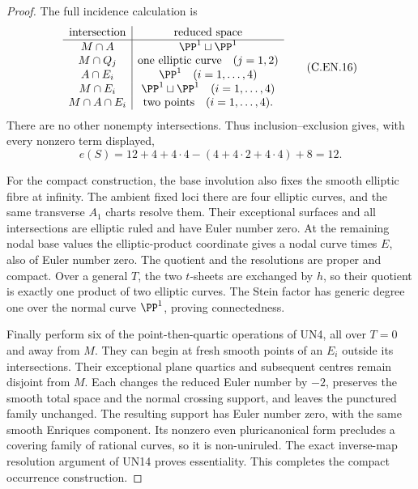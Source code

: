\begin{proof}
The full incidence calculation is
\[
 \begin{array}{c|c}
 \text{intersection}&\text{reduced space}\\ \hline
 M\cap A&\PP^1\sqcup\PP^1\\
 M\cap Q_j&\text{one elliptic curve}\quad(j=1,2)\\
 A\cap E_i&\PP^1\quad(i=1,\ldots,4)\\
 M\cap E_i&\PP^1\sqcup\PP^1\quad(i=1,\ldots,4)\\
 M\cap A\cap E_i&\text{two points}\quad(i=1,\ldots,4).
 \end{array}                                             \tag{C.EN.16}
\]
There are no other nonempty intersections.
Thus inclusion--exclusion gives, with
every nonzero term displayed,
\[
 e(S)=12+4+4\cdot4-(4+4\cdot2+4\cdot4)+8=12 .
                                                               \tag{C.EN.17}
\]

For the compact construction, the base involution
also fixes the smooth elliptic fibre at infinity.
The ambient fixed loci there are four elliptic
curves, and the same transverse $A_1$ charts
resolve them. Their exceptional surfaces and
all intersections are elliptic ruled and
have Euler number zero. At the remaining
nodal base values the elliptic-product
coordinate gives a nodal curve times $E$,
also of Euler number zero. The quotient
and the resolutions are proper and compact.
Over a general $T$, the two $t$-sheets
are exchanged by $h$, so their quotient
is exactly one product of two elliptic
curves. The Stein factor has generic
degree one over the normal curve
$\PP^1$, proving connectedness.

Finally perform six of the point-then-quartic
operations of UN4, all over $T=0$ and
away from $M$. They can begin at fresh
smooth points of an $E_i$ outside its
intersections. Their exceptional plane
quartics and subsequent centres remain
disjoint from $M$. Each changes the
reduced Euler number by $-2$, preserves
the smooth total space and the normal
crossing support, and leaves the
punctured family unchanged. The resulting
support has Euler number zero, with
the same smooth Enriques component.
Its nonzero even pluricanonical form
precludes a covering family of rational
curves, so it is non-uniruled.
The exact inverse-map resolution argument
of UN14 proves essentiality. This completes
the compact occurrence construction.

\end{proof}
